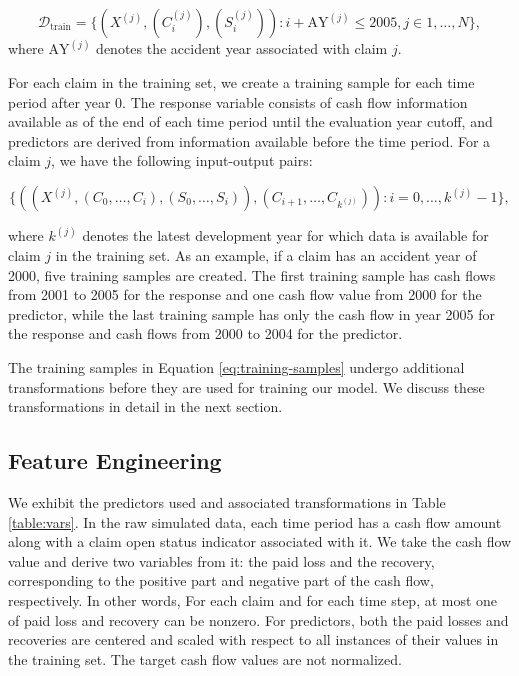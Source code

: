 \documentclass{article}
\begin{document}
\begin{equation}
    \mathcal{D}_{\text{train}} = \{ (X^{(j)}, (C_i^{(j)}), (S_i^{(j)})): i + \text{AY}^{(j)} \leq 2005, j \in {1,\dots, N}\},
\end{equation}
where $\text{AY}^{(j)}$ denotes the accident year associated with claim $j$.

For each claim in the training set, we create a training sample for each time period after year 0. The response variable consists of cash flow information available as of the end of each time period until the evaluation year cutoff, and predictors are derived from information available before the time period. For a claim $j$, we have the following input-output pairs:

\begin{equation}\label{eq:training-samples}
    \{((X^{(j)}, (C_0, \dots, C_i), (S_0, \dots, S_i)), (C_{i+1}, \dots, C_{k^{(j)}})): i = 0, \dots, k^{(j)} - 1\},
\end{equation}

where $k^{(j)}$ denotes the latest development year for which data is available for claim $j$ in the training set. As an example, if a claim has an accident year of 2000, five training samples are created. The first training sample has cash flows from 2001 to 2005 for the response and one cash flow value from 2000 for the predictor, while the last training sample has only the cash flow in year 2005 for the response and cash flows from 2000 to 2004 for the predictor.

The training samples in Equation \ref{eq:training-samples} undergo additional transformations before they are used for training our model. We discuss these transformations in detail in the next section.

\subsection{Feature Engineering} \label{sec:fe}

We exhibit the predictors used and associated transformations in Table \ref{table:vars}. In the raw simulated data, each time period has a cash flow amount along with a claim open status indicator associated with it. We take the cash flow value and derive two variables from it: the paid loss and the recovery, corresponding to the positive part and negative part of the cash flow, respectively. In other words, For each claim and for each time step, at most one of paid loss and recovery can be nonzero. For predictors, both the paid losses and recoveries are centered and scaled with respect to all instances of their values in the training set. The target cash flow values are not normalized.
\end{document}
